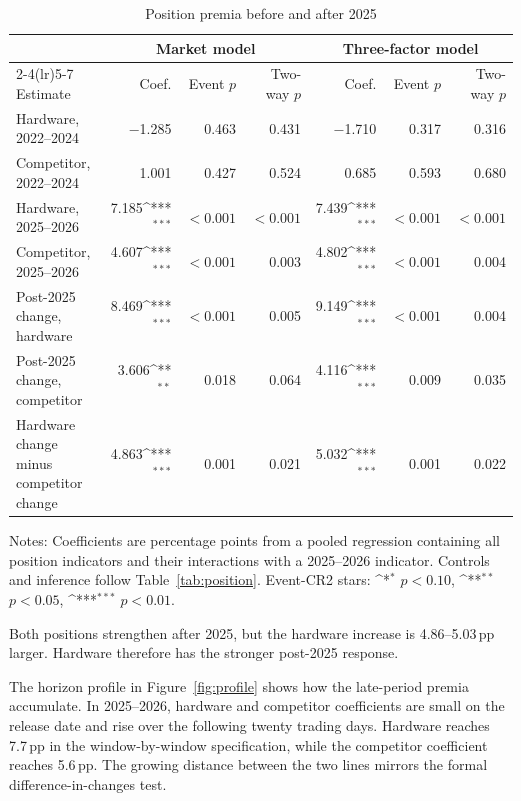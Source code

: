 \documentclass[review,12pt,authoryear]{elsarticle}
\newcommand{\pp}{\,pp}
\newcommand{\sym}[1]{\ifmmode^{#1}\else\(^{#1}\)\fi}
\begin{document}
\begin{table}[t!]
\centering
\begin{threeparttable}
\caption{Position premia before and after 2025}
\label{tab:time}
\scriptsize
\setlength{\tabcolsep}{1.9pt}
\begin{tabular}{lrrrrrr}
\toprule
& \multicolumn{3}{c}{Market model}
& \multicolumn{3}{c}{Three-factor model} \\
\cmidrule(lr){2-4}\cmidrule(lr){5-7}
Estimate & Coef. & Event $p$ & Two-way $p$
& Coef. & Event $p$ & Two-way $p$ \\
\midrule
Hardware, 2022--2024
 & $-$1.285 & 0.463 & 0.431 & $-$1.710 & 0.317 & 0.316 \\
Competitor, 2022--2024
 & 1.001 & 0.427 & 0.524 & 0.685 & 0.593 & 0.680 \\
Hardware, 2025--2026
 & 7.185\sym{***} & $<0.001$ & $<0.001$ & 7.439\sym{***} & $<0.001$ & $<0.001$ \\
Competitor, 2025--2026
 & 4.607\sym{***} & $<0.001$ & 0.003 & 4.802\sym{***} & $<0.001$ & 0.004 \\
\addlinespace
Post-2025 change, hardware
 & 8.469\sym{***} & $<0.001$ & 0.005 & 9.149\sym{***} & $<0.001$ & 0.004 \\
Post-2025 change, competitor
 & 3.606\sym{**} & 0.018 & 0.064 & 4.116\sym{***} & 0.009 & 0.035 \\
Hardware change minus competitor change
 & 4.863\sym{***} & 0.001 & 0.021 & 5.032\sym{***} & 0.001 & 0.022 \\
\bottomrule
\end{tabular}
\begin{tablenotes}\footnotesize
\item Notes: Coefficients are percentage points from a pooled regression
containing all position indicators and their interactions with a
2025--2026 indicator. Controls and inference follow
Table~\ref{tab:position}.
Event-CR2 stars: \sym{*} $p<0.10$, \sym{**} $p<0.05$,
\sym{***} $p<0.01$.
\end{tablenotes}
\end{threeparttable}
\end{table}

Both positions strengthen after 2025, but the hardware increase is
4.86--5.03\pp{} larger. Hardware therefore has the stronger post-2025
response.

The horizon profile in Figure~\ref{fig:profile} shows how the late-period
premia accumulate. In 2025--2026, hardware and competitor coefficients are
small on the release date and rise over the following twenty trading days.
Hardware reaches 7.7\pp{} in the window-by-window specification, while the
competitor coefficient reaches 5.6\pp{}. The growing distance between the
two lines mirrors the formal difference-in-changes test.
\end{document}
